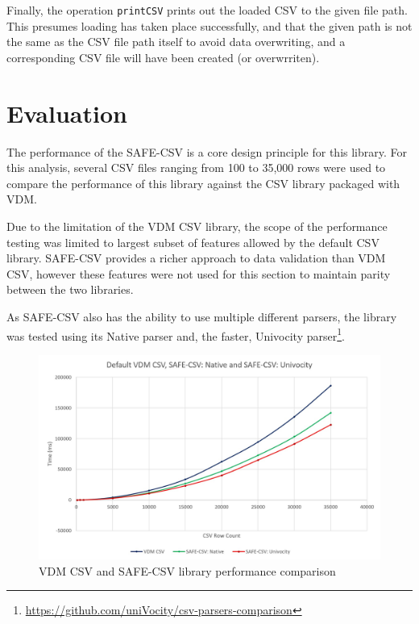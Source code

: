 \documentclass[runningheads,a4paper]{llncs}
\begin{document}
Finally, the operation \texttt{printCSV} prints out the loaded CSV to the given file path. This presumes loading has taken place successfully, and that the given path is not the same as the CSV file path itself to avoid data overwriting, and a corresponding CSV file will have been created (or overwrriten).  

\section{Evaluation}\label{sec:Evaluation}

The performance of the SAFE-CSV is a core design principle for this library. For this analysis, several CSV files ranging from 100 to 35,000 rows were used to compare the performance of this library against the CSV library packaged with VDM.

Due to the limitation of the VDM CSV library, the scope of the performance testing was limited to largest subset of features allowed by the default CSV library. SAFE-CSV provides a richer approach to data validation than VDM CSV, however these features were not used for this section to maintain parity between the two libraries. 

As SAFE-CSV also has the ability to use multiple different parsers, the library was tested using its Native parser and, the faster, Univocity parser\footnote{\url{https://github.com/uniVocity/csv-parsers-comparison}}.

\begin{figure}[htbp]
    \centering
        \includegraphics[width=\textwidth]{figures/CSVPerformanceChart.jpg}
    \caption{VDM CSV and SAFE-CSV library performance comparison}\label{fig:CSVPerformanceChart}
 \end{figure}
\end{document}
